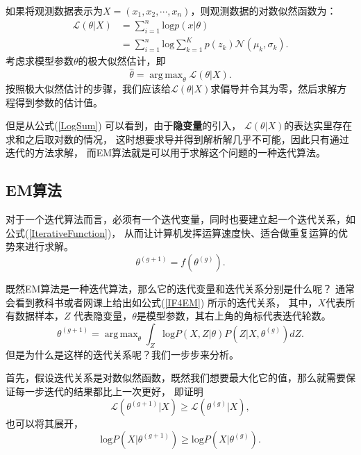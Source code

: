 \documentclass[UTF8]{ctexart}
\DeclareMathOperator*{\argmax}{arg\,max}
\begin{document}
如果将观测数据表示为$X=(x_1, x_2, \cdots, x_n)$，则观测数据的对数似然函数为：
\begin{equation}\label{LogSum}
  \begin{split}
    \mathcal{L}(\theta|X) &= \sum_{i=1}^{n}\mathrm{log}p(x|\theta)\\
    &= \sum_{i=1}^{n}\mathrm{log}\sum_{k=1}^{K}p(z_k) \mathcal{N}(\mu_k, \sigma_k).
  \end{split}
\end{equation}
考虑求模型参数$\theta$的极大似然估计，即
\begin{equation}\label{MaxLLH}
  \hat\theta = \argmax_{\theta}\mathcal{L}(\theta|X).
\end{equation}
按照极大似然估计的步骤，我们应该给$\mathcal{L}(\theta|X)$求偏导并令其为零，然后求解方程得到参数的估计值。

但是从公式(\ref{LogSum}) 可以看到，由于\textbf{隐变量}的引入，
$\mathcal{L}(\theta|X)$的表达实里存在求和之后取对数的情况，
这时想要求导并得到解析解几乎不可能，因此只有通过迭代的方法求解，
而EM算法就是可以用于求解这个问题的一种迭代算法。

\subsection{EM算法}

对于一个迭代算法而言，必须有一个迭代变量，同时也要建立起一个迭代关系，如公式(\ref{IterativeFunction})，
从而让计算机发挥运算速度快、适合做重复运算的优势来进行求解。
\begin{equation}\label{IterativeFunction}
  \theta^{(g+1)} = f \left (\theta^{(g)} \right).
\end{equation}

既然EM算法是一种迭代算法，那么它的迭代变量和迭代关系分别是什么呢？
通常会看到教科书或者网课上给出如公式(\ref{IF4EM}) 所示的迭代关系，
其中，$X$代表所有数据样本，$Z$ 代表隐变量，$\theta$是模型参数，其右上角的角标代表迭代轮数。
\begin{equation}\label{IF4EM}
  {\theta^{(g+1)} = \argmax_{\theta} \int_{Z}\mathrm{log}P (X, Z | \theta) P \left(Z|X, \theta^{(g)} \right)dZ}.
\end{equation}
但是为什么是这样的迭代关系呢？我们一步步来分析。

首先，假设迭代关系是对数似然函数，既然我们想要最大化它的值，那么就需要保证每一步迭代的结果都比上一次更好，
即证明
\begin{equation}
  \mathcal{L} \left(\theta^{(g+1)}|X \right) \ge \mathcal{L} \left(\theta^{(g)}|X \right),
\end{equation}
也可以将其展开，
\begin{equation}\label{EMCondition}
  {\mathrm{log}P \left(X|\theta^{(g+1)} \right) \ge \mathrm{log} P \left(X|\theta^{(g)}\right)}.
\end{equation}
\end{document}
